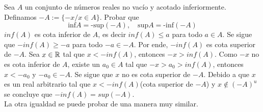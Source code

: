 \item Sea $A$ un conjunto de números reales no vacío y acotado inferiormente. Definamos $-A:=\{-x/x\in A\}$. Probar que \[\text{inf}A=\text{-sup}(-A),\quad\text{sup}A=\text{-inf}(-A)\]
    $inf(A)$ es cota inferior de $A$, es decir $inf(A)\leq a$ para todo $a\in A$. Se sigue que $-inf(A)\geq-a$ para todo $-a\in-A$. Por ende, $-inf(A)$ es cota superior de $-A$. Sea $x\in\mathbb{R}$ tal que $x<-inf(A)$, entonces $-x>inf(A)$. Como $-x$ no es cota inferior de $A$, existe un $a_0\in A$ tal que $-x>a_0>inf(A)$, entonces $x<-a_0$ y $-a_0\in -A$. Se sigue que $x$ no es cota superior de $-A$. Debido a que $x$ es un real arbitrario tal que $x<-inf(A)$(cota superior de $-A$) y $x\notin (-A)^u$ se concluye que $-inf(A)=sup(-A)$.\\
    La otra igualdad se puede probar de una manera muy similar. 